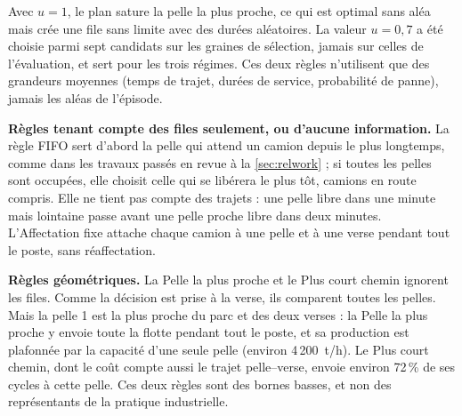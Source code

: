 \documentclass[11pt,a4paper]{article}
\newif\ifrevmarks
\newcommand{\revtag}[1]{\ifrevmarks\textsuperscript{\textcolor{red!70!black}{\scriptsize[#1]}}\fi}
\newenvironment{revbloc}[1]{\par\ifrevmarks\color{revcolor}\noindent\revtag{#1}\ \fi}{\par}
\newif\ifcorrmarks
\newenvironment{corrbloc}{\par\ifcorrmarks\color{corrcolor}\fi}{\par}
\begin{document}
\begin{revbloc}{M25, M16, Dir. corr. 1, A, v3}
\begin{corrbloc}
\end{corrbloc}
 Avec $u = 1$, le plan sature la pelle la plus proche, ce qui est optimal sans aléa mais crée une file sans limite avec des durées aléatoires. La valeur $u = 0{,}7$ a été choisie parmi sept candidats sur les graines de sélection, jamais sur celles de l'évaluation, et sert pour les trois régimes. Ces deux règles n'utilisent que des grandeurs moyennes (temps de trajet, durées de service, probabilité de panne), jamais les aléas de l'épisode.

\textbf{Règles tenant compte des files seulement, ou d'aucune information.} La règle FIFO sert d'abord la pelle qui attend un camion depuis le plus longtemps, comme dans les travaux passés en revue à la \cref{sec:relwork} ; si toutes les pelles sont occupées, elle choisit celle qui se libérera le plus tôt, camions en route compris. Elle ne tient pas compte des trajets : une pelle libre dans une minute mais lointaine passe avant une pelle proche libre dans deux minutes. L'Affectation fixe attache chaque camion à une pelle et à une verse pendant tout le poste, sans réaffectation.

\textbf{Règles géométriques.} La Pelle la plus proche et le Plus court chemin ignorent les files. Comme la décision est prise à la verse, ils comparent toutes les pelles. Mais la pelle 1 est la plus proche du parc et des deux verses : la Pelle la plus proche y envoie toute la flotte pendant tout le poste, et sa production est plafonnée par la capacité d'une seule pelle (environ 4\,200~t/h). Le Plus court chemin, dont le coût compte aussi le trajet pelle--verse, envoie environ 72\,\% de ses cycles à cette pelle. Ces deux règles sont des bornes basses, et non des représentants de la pratique industrielle.
\end{revbloc}
\end{document}
